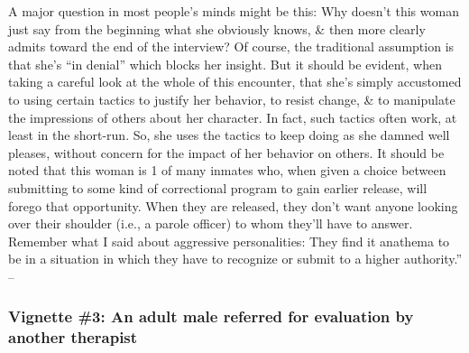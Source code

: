 \documentclass{article}
\numberwithin{equation}{section}
\begin{document}
A major question in most people's minds might be this: Why doesn't this woman just say from the beginning what she obviously knows, \& then more clearly admits toward the end of the interview? Of course, the traditional assumption is that she's ``in denial'' which blocks her insight. But it should be evident, when taking a careful look at the whole of this encounter, that she's simply accustomed to using certain tactics to justify her behavior, to resist change, \& to manipulate the impressions of others about her character. In fact, such tactics often work, at least in the short-run. So, she uses the tactics to keep doing as she damned well pleases, without concern for the impact of her behavior on others. It should be noted that this woman is 1 of many inmates who, when given a choice between submitting to some kind of correctional program to gain earlier release, will forego that opportunity. When they are released, they don't want anyone looking over their shoulder (i.e., a parole officer) to whom they'll have to answer. Remember what I said about aggressive personalities: They find it anathema to be in a situation in which they have to recognize or submit to a higher authority.'' -- \cite[pp. 222--226]{Simon2011}

\subsubsection{Vignette \#3: An adult male referred for evaluation by another therapist}
\end{document}
